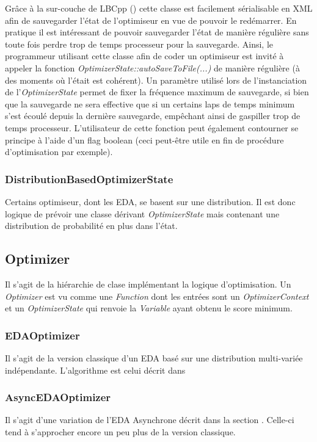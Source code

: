 \documentclass[a4paper, 11pt]{report}
\begin{document}
Grâce à la sur-couche de LBCpp ()%
cette classe est facilement sérialisable en XML afin de sauvegarder l'état de l'optimiseur en vue de pouvoir le redémarrer. En pratique il est intéressant de pouvoir sauvegarder l'état de manière régulière sans toute fois perdre trop de temps processeur pour la sauvegarde. Ainsi, le programmeur utilisant cette classe afin de coder un optimiseur est invité à appeler la fonction \textit{OptimizerState::autoSaveToFile(...)} de manière régulière (à des moments où l'était est cohérent). Un paramètre utilisé lors de l'instanciation de l'\textit{OptimizerState} permet de fixer la fréquence maximum de sauvegarde, si bien que la sauvegarde ne sera effective que si un certains laps de temps minimum s'est écoulé depuis la dernière sauvegarde, empêchant ainsi de gaspiller trop de temps processeur. L'utilisateur de cette fonction peut également contourner se principe à l'aide d'un flag boolean (ceci peut-être utile en fin de procédure d'optimisation par exemple). 

\subsubsection{DistributionBasedOptimizerState}
Certains optimiseur, dont les EDA, se basent sur une distribution. Il est donc logique de prévoir une classe dérivant \textit{OptimizerState} mais contenant une distribution de probabilité en plus dans l'état.


\subsection{Optimizer}
Il s'agit de la hiérarchie de clase implémentant la logique d'optimisation. Un \textit{Optimizer} est vu comme une \textit{Function} dont les entrées sont un \textit{OptimizerContext} et un \textit{OptimizerState} qui renvoie la \textit{Variable} ayant obtenu le score minimum.

\subsubsection{EDAOptimizer}
Il s'agit de la version classique d'un EDA basé sur une distribution multi-variée indépendante. L'algorithme est celui décrit dans %

\subsubsection{AsyncEDAOptimizer}
Il s'agit d'une variation de l'EDA Asynchrone décrit dans la section .%
Celle-ci tend à s'approcher encore un peu plus de la version classique. 
\end{document}
